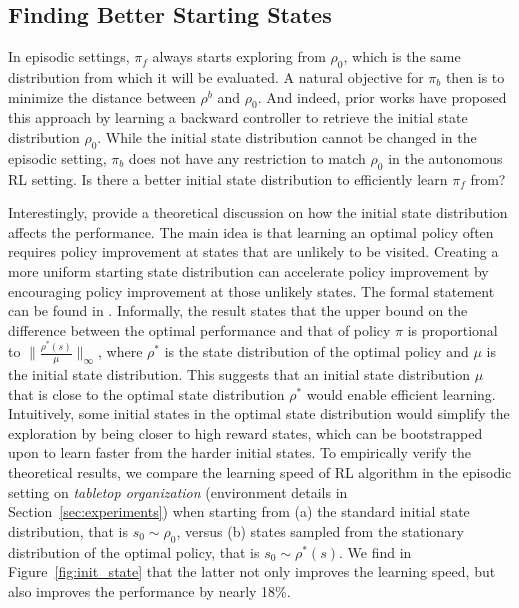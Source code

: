 \documentclass[nohyperref]{article}
\theoremstyle{plain}
\theoremstyle{definition}
\theoremstyle{remark}
\begin{document}
\subsection{Finding Better Starting States}
\label{sec:kakade}
In episodic settings, $\pi_f$ always starts exploring from $\rho_0$, which is the same distribution from which it will be evaluated. A natural objective for $\pi_b$ then is to minimize the distance between $\rho^b$ and $\rho_0$. And indeed, prior works have proposed this approach \citep{han2015learning, eysenbach2017leave} by learning a backward controller to retrieve the initial state distribution $\rho_0$. While the initial state distribution cannot be changed in the episodic setting, $\pi_b$ does not have any restriction to match $\rho_0$ in the autonomous RL setting. Is there a better initial state distribution to efficiently learn $\pi_f$ from?

Interestingly, \citet{kakade2002approximately} provide a theoretical discussion on how the initial state distribution affects the performance. The main idea is that learning an optimal policy often requires policy improvement at states that are unlikely to be visited. Creating a more uniform starting state distribution can accelerate policy improvement by encouraging policy improvement at those unlikely states. The formal statement can be found in \citep[Corollary~4.5]{kakade2002approximately}. Informally, the result states that the upper bound on the difference between the optimal performance and that of policy $\pi$ is proportional to $\lVert\frac{\rho^*(s)}{\mu}\rVert_{\infty}$, where $\rho^*$ is the state distribution of the optimal policy and $\mu$ is the initial state distribution. This suggests that an initial state distribution $\mu$ that is close to the optimal state distribution $\rho^*$ would enable efficient learning. Intuitively, some initial states in the optimal state distribution would simplify the exploration by being closer to high reward states, which can be bootstrapped upon to learn faster from the harder initial states. To empirically verify the theoretical results, we compare the learning speed of RL algorithm in the episodic setting on \textit{tabletop organization} (environment details in Section~\ref{sec:experiments}) when starting from (a) the standard initial state distribution, that is $s_0 \sim \rho_0$, versus (b) states sampled from the stationary distribution of the optimal policy, that is $s_0 \sim \rho^*(s)$. We find in Figure~\ref{fig:init_state} that the latter not only improves the learning speed, but also improves the performance by nearly 18\%.
\end{document}
